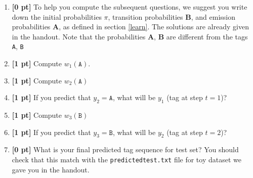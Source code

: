 \documentclass{article}
\begin{document}
\begin{enumerate}

    \item \textbf{[0 pt]} To help you compute the subsequent questions, we suggest you write down the initial probabilities $\pi$, transition probabilities $\textbf{B}$, and emission probabilities $\textbf{A}$, as defined in section \ref{learn}. The solutions are already given in the handout. Note that the probabilities $\textbf{A}$, $\textbf{B}$ are different from the tags \texttt{A}, \texttt{B}
    
    \item \textbf{[1 pt]} Compute $w_1(\texttt{A})$.
    
    \begin{tcolorbox}[fit,height=1cm, width=2cm, blank, borderline={1pt}{-2pt}]
        \end{tcolorbox}
    
    \item \textbf{[1 pt]} Compute $w_2(\texttt{A})$
    
    \begin{tcolorbox}[fit,height=1cm, width=2cm, blank, borderline={1pt}{-2pt}]
        \end{tcolorbox}
    
    \item \textbf{[1 pt]} If you predict that $y_2 = \texttt{A}$, what will be $y_1$ (tag at step $t = 1$)? 
    
    \begin{tcolorbox}[fit,height=1cm, width=2cm, blank, borderline={1pt}{-2pt}]
        \end{tcolorbox}
    
    \item \textbf{[1 pt]} Compute $w_3(\texttt{B})$
    
    \begin{tcolorbox}[fit,height=1cm, width=2cm, blank, borderline={1pt}{-2pt}]
        \end{tcolorbox}
    
    \item \textbf{[1 pt]} If you predict that $y_3 = \texttt{B}$, what will be $y_2$ (tag at step $t = 2$)?
    
    \begin{tcolorbox}[fit,height=1cm, width=2cm, blank, borderline={1pt}{-2pt}]
        \end{tcolorbox}
    
    \item \textbf{[0 pt]} What is your final predicted tag sequence for test set? You should check that this match with the \texttt{predictedtest.txt} file for toy dataset we gave you in the handout.
    
\end{enumerate}
\end{document}
